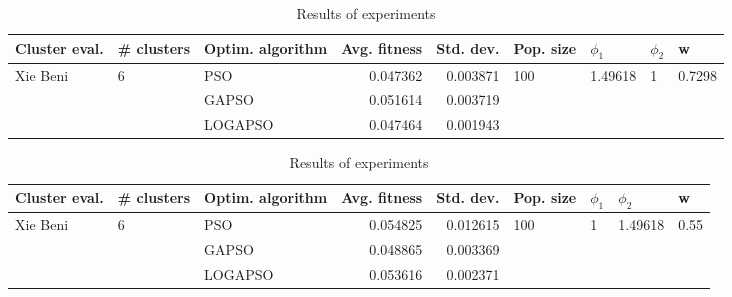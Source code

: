 \documentclass{article}
\begin{document}
\begin{table}
\centering
\caption{Results of experiments}
\begin{tabular}{lllrrllll}
\toprule
            Cluster eval. &        \# clusters & Optim. algorithm &  Avg. fitness &  Std. dev. &            Pop. size &               $\phi_{1}$ &         $\phi_{2}$ &                       w \\
\midrule
\multirow{3}{*}{Xie Beni} & \multirow{3}{*}{6} &              PSO &      0.047362 &   0.003871 & \multirow{3}{*}{100} & \multirow{3}{*}{1.49618} & \multirow{3}{*}{1} & \multirow{3}{*}{0.7298} \\
                          &                    &            GAPSO &      0.051614 &   0.003719 &                      &                          &                    &                         \\
                          &                    &          LOGAPSO &      0.047464 &   0.001943 &                      &                          &                    &                         \\
\bottomrule
\end{tabular}
\end{table}
\begin{table}
\centering
\caption{Results of experiments}
\begin{tabular}{lllrrllll}
\toprule
            Cluster eval. &        \# clusters & Optim. algorithm &  Avg. fitness &  Std. dev. &            Pop. size &         $\phi_{1}$ &               $\phi_{2}$ &                     w \\
\midrule
\multirow{3}{*}{Xie Beni} & \multirow{3}{*}{6} &              PSO &      0.054825 &   0.012615 & \multirow{3}{*}{100} & \multirow{3}{*}{1} & \multirow{3}{*}{1.49618} & \multirow{3}{*}{0.55} \\
                          &                    &            GAPSO &      0.048865 &   0.003369 &                      &                    &                          &                       \\
                          &                    &          LOGAPSO &      0.053616 &   0.002371 &                      &                    &                          &                       \\
\bottomrule
\end{tabular}
\end{table}
\end{document}
